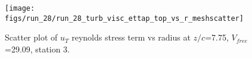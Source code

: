 \begin{figure}[H]
\centering
\texttt{[image: figs/run\_28/run\_28\_turb\_visc\_ettap\_top\_vs\_r\_meshscatter]}
\caption{Scatter plot of $
u_T$ reynolds stress term vs radius at $z/c$=7.75, $V_{free}$=29.09, station 3.}
\label{fig:run_28_turb_visc_ettap_top_vs_r_meshscatter}
\end{figure}


